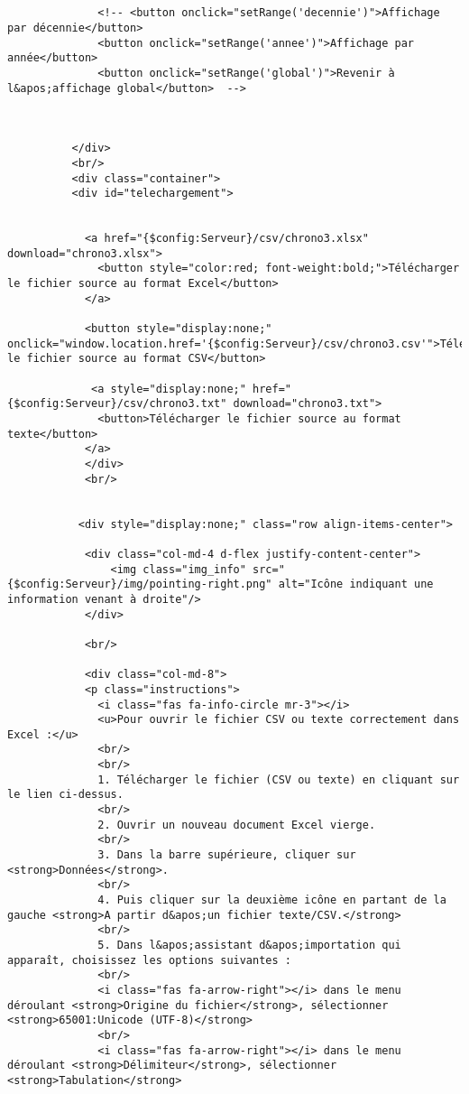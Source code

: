 \begin{verbatim}
             
              
              <!-- <button onclick="setRange('decennie')">Affichage par décennie</button>
              <button onclick="setRange('annee')">Affichage par année</button>
              <button onclick="setRange('global')">Revenir à l&apos;affichage global</button>  -->             
              
              
              
          </div>
          <br/>
          <div class="container">
          <div id="telechargement">           
            
            
            <a href="{$config:Serveur}/csv/chrono3.xlsx" download="chrono3.xlsx">
              <button style="color:red; font-weight:bold;">Télécharger le fichier source au format Excel</button>
            </a> 
            
            <button style="display:none;" onclick="window.location.href='{$config:Serveur}/csv/chrono3.csv'">Télécharger le fichier source au format CSV</button>
            
             <a style="display:none;" href="{$config:Serveur}/csv/chrono3.txt" download="chrono3.txt">
              <button>Télécharger le fichier source au format texte</button>
            </a> 
            </div> 
            <br/>  
            
                   
           <div style="display:none;" class="row align-items-center">

            <div class="col-md-4 d-flex justify-content-center">
                <img class="img_info" src="{$config:Serveur}/img/pointing-right.png" alt="Icône indiquant une information venant à droite"/>
            </div>
            
            <br/>
            
            <div class="col-md-8">      
            <p class="instructions">
              <i class="fas fa-info-circle mr-3"></i>
              <u>Pour ouvrir le fichier CSV ou texte correctement dans Excel :</u>
              <br/>          
              <br/> 
              1. Télécharger le fichier (CSV ou texte) en cliquant sur le lien ci-dessus.
              <br/>
              2. Ouvrir un nouveau document Excel vierge.
              <br/> 
              3. Dans la barre supérieure, cliquer sur <strong>Données</strong>.
              <br/> 
              4. Puis cliquer sur la deuxième icône en partant de la gauche <strong>A partir d&apos;un fichier texte/CSV.</strong>
              <br/> 
              5. Dans l&apos;assistant d&apos;importation qui apparaît, choisissez les options suivantes :
              <br/>     
              <i class="fas fa-arrow-right"></i> dans le menu déroulant <strong>Origine du fichier</strong>, sélectionner <strong>65001:Unicode (UTF-8)</strong>
              <br/> 
              <i class="fas fa-arrow-right"></i> dans le menu déroulant <strong>Délimiteur</strong>, sélectionner <strong>Tabulation</strong>
              

\end{verbatim}
